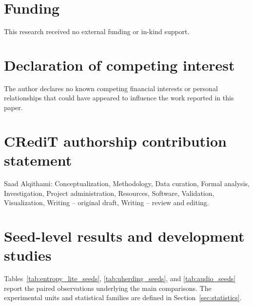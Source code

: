 \documentclass[a4paper,fleqn]{cas-dc}
\begin{document}
\FloatBarrier
\section*{Funding}
This research received no external funding or in-kind support.

\section*{Declaration of competing interest}
The author declares no known competing financial interests or personal
relationships that could have appeared to influence the work reported
in this paper.

\section*{CRediT authorship contribution statement}
Saad Alqithami: Conceptualization, Methodology, Data curation,
Formal analysis, Investigation, Project administration, Resources,
Software, Validation, Visualization, Writing -- original draft,
Writing -- review and editing.

\medskip
\appendix

\section{Seed-level results and development studies}\label{app:classification_details}
Tables~\ref{tab:entropy_lite_seeds}, \ref{tab:uherding_seeds}, and
\ref{tab:audio_seeds} report the paired observations underlying the main
comparisons. The experimental units and statistical families are defined
in Section~\ref{sec:statistics}.
\end{document}
